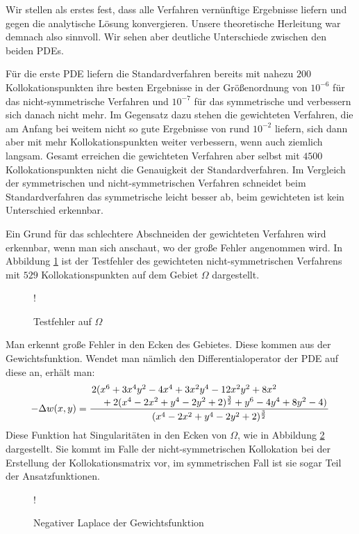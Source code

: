 Wir stellen als erstes fest, dass alle Verfahren vernünftige Ergebnisse liefern und gegen die analytische Lösung konvergieren. Unsere theoretische Herleitung war demnach also sinnvoll. Wir sehen aber deutliche Unterschiede zwischen den beiden \acp{PDE}.

Für die erste \ac{PDE} liefern die Standardverfahren bereits mit nahezu $200$ Kollokationspunkten ihre besten Ergebnisse in der Größenordnung von $10^{-6}$ für das nicht-symmetrische Verfahren und $10^{-7}$ für das symmetrische und verbessern sich danach nicht mehr. Im Gegensatz dazu stehen die gewichteten Verfahren, die am Anfang bei weitem nicht so gute Ergebnisse von rund $10^{-2}$ liefern, sich dann aber mit mehr Kollokationspunkten weiter verbessern, wenn auch ziemlich langsam. Gesamt erreichen die gewichteten Verfahren aber selbst mit $4500$ Kollokationspunkten nicht die Genauigkeit der Standardverfahren. Im Vergleich der symmetrischen und nicht-symmetrischen Verfahren schneidet beim Standardverfahren das symmetrische leicht besser ab, beim gewichteten ist kein Unterschied erkennbar.

Ein Grund für das schlechtere Abschneiden der gewichteten Verfahren wird erkennbar, wenn man sich anschaut, wo der große Fehler angenommen wird. In Abbildung \ref{fig:Vergleich} ist der Testfehler des gewichteten nicht-symmetrischen Verfahrens mit $529$ Kollokationspunkten auf dem Gebiet $\Omega$ dargestellt.

\begin{figure}[ht]
\centering
\resizebox {\columnwidth} {!} {

}
\caption{Testfehler auf $\Omega$}
\label{fig:Vergleich}
\end{figure}

Man erkennt große Fehler in den Ecken des Gebietes. Diese kommen aus der Gewichtsfunktion. Wendet man nämlich den Differentialoperator der \ac{PDE} auf diese an, erhält man:
\begin{align*}
-\Delta w(x,y) = \frac{\splitfrac{ 2(x^6+3x^4y^2-4x^4+3x^2y^4-12x^2y^2+8x^2}{+2(x^4-2x^2+y^4-2y^2+2)^{\frac{3}{2}}+y^6-4y^4+8y^2-4)}}{(x^4-2x^2+y^4-2y^2+2)^{\frac{3}{2}}}
\end{align*}
Diese Funktion hat Singularitäten in den Ecken von $\Omega$, wie in Abbildung \ref{fig:Gewicht} dargestellt. Sie kommt im Falle der nicht-symmetrischen Kollokation bei der Erstellung der Kollokationsmatrix vor, im symmetrischen Fall ist sie sogar Teil der Ansatzfunktionen.
\begin{figure}[ht]
\centering
\resizebox {\columnwidth} {!} {

}
\caption{Negativer Laplace der Gewichtsfunktion}
\label{fig:Gewicht}
\end{figure}

